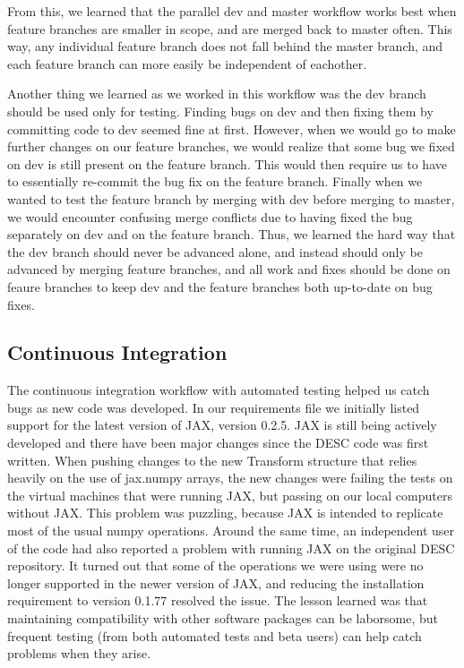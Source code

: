 \documentclass{article}
\begin{document}
From this, we learned that the parallel dev and master workflow works best when feature branches are smaller in scope, and are merged back to master often.
This way, any individual feature branch does not fall behind the master branch, and each feature branch can more easily be independent of eachother.

Another thing we learned as we worked in this workflow was the dev branch should be used only for testing.
Finding bugs on dev and then fixing them by committing code to dev seemed fine at first.
However, when we would go to make further changes on our feature branches, we would realize that some bug we fixed on dev is still present on the feature branch.
This would then require us to have to essentially re-commit the bug fix on the feature branch.
Finally when we wanted to test the feature branch by merging with dev before merging to master, we would encounter confusing merge conflicts due to having fixed the bug separately on dev and on the feature branch.
Thus, we learned the hard way that the dev branch should never be advanced alone, and instead should only be advanced by merging feature branches, and all work and fixes should be done on feaure branches to keep dev and the feature branches both up-to-date on bug fixes.

\subsection{Continuous Integration}

The continuous integration workflow with automated testing helped us catch bugs as new code was developed.
In our requirements file we initially listed support for the latest version of JAX, version 0.2.5.
JAX is still being actively developed and there have been major changes since the DESC code was first written.
When pushing changes to the new Transform structure that relies heavily on the use of jax.numpy arrays, the new changes were failing the tests on the virtual machines that were running JAX, but passing on our local computers without JAX.
This problem was puzzling, because JAX is intended to replicate most of the usual numpy operations.
Around the same time, an independent user of the code had also reported a problem with running JAX on the original DESC repository.
It turned out that some of the operations we were using were no longer supported in the newer version of JAX, and reducing the installation requirement to version 0.1.77 resolved the issue.
The lesson learned was that maintaining compatibility with other software packages can be laborsome, but frequent testing (from both automated tests and beta users) can help catch problems when they arise.
\end{document}
